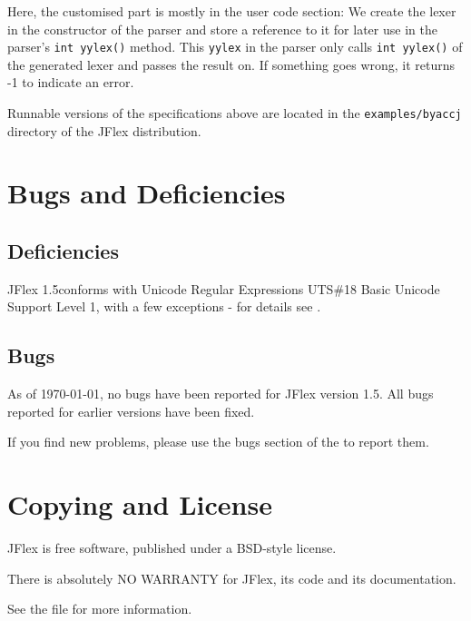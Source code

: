 \documentclass[11pt]{scrartcl}
\newcommand{\ver}{1.5}
\begin{document}
Here, the customised part is mostly in the user code section:
We create the lexer in the constructor of the parser and store
a reference to it for later use in the parser's \texttt{int yylex()}
method. This \texttt{yylex} in the parser only calls \texttt{int yylex()}
of the generated lexer and passes the result on. If something goes
wrong, it returns -1 to indicate an error.

Runnable versions of the specifications above 
are located in the \texttt{examples/byaccj} directory of the JFlex 
distribution.

\section{Bugs and Deficiencies\label{Bugs}}

\subsection{Deficiencies}
JFlex \ver conforms with Unicode Regular Expressions
UTS\#18 \cite{unicode_rep} Basic Unicode Support Level 1, with
a few exceptions - for details see 
.

\subsection{Bugs}
As of {\today}, no bugs have been reported for JFlex version \ver. All 
bugs reported for earlier versions have been fixed.

If you find new problems, please use the bugs section of the
to report them.
 
 
\section{Copying and License\label{Copyright}}
JFlex is free software, published under a BSD-style license.

There is absolutely NO WARRANTY for JFlex, its code and its documentation.

See the file  for more
information.
\end{document}
